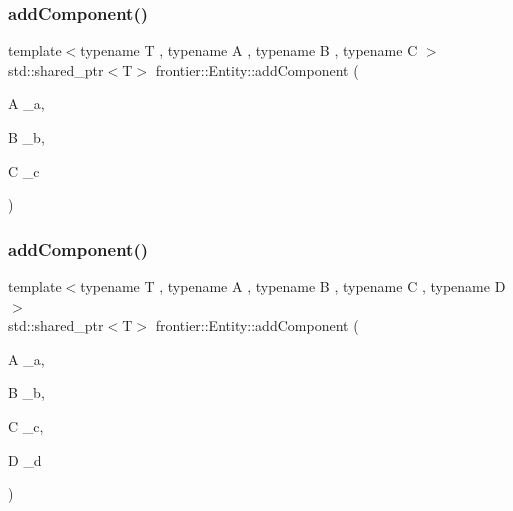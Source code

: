 \subsubsection{\texorpdfstring{add\+Component()}{addComponent()}\hspace{0.1cm}{\footnotesize\ttfamily [4/5]}}
{\footnotesize\ttfamily template$<$typename T , typename A , typename B , typename C $>$ \\
std\+::shared\+\_\+ptr$<$T$>$ frontier\+::\+Entity\+::add\+Component (\begin{DoxyParamCaption}\item[{A}]{\+\_\+a,  }\item[{B}]{\+\_\+b,  }\item[{C}]{\+\_\+c }\end{DoxyParamCaption})\hspace{0.3cm}{\ttfamily [inline]}}

\mbox{\label{classfrontier_1_1_entity_a0a77572b04da8df53eea3aab783df9c7}} 
\subsubsection{\texorpdfstring{add\+Component()}{addComponent()}\hspace{0.1cm}{\footnotesize\ttfamily [5/5]}}
{\footnotesize\ttfamily template$<$typename T , typename A , typename B , typename C , typename D $>$ \\
std\+::shared\+\_\+ptr$<$T$>$ frontier\+::\+Entity\+::add\+Component (\begin{DoxyParamCaption}\item[{A}]{\+\_\+a,  }\item[{B}]{\+\_\+b,  }\item[{C}]{\+\_\+c,  }\item[{D}]{\+\_\+d }\end{DoxyParamCaption})\hspace{0.3cm}{\ttfamily [inline]}}

\mbox{\label{classfrontier_1_1_entity_a7e8950fc46a87fca465a94f66ac40494}} 
